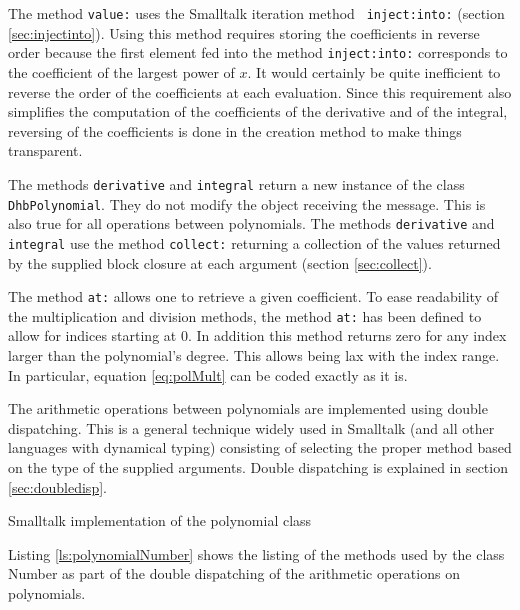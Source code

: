 \documentclass[twoside]{book}
\begin{document}
The method {\tt value:} uses the Smalltalk iteration method {\tt
inject:into:} (\cf section \ref{sec:injectinto}). Using this
method requires storing the coefficients in reverse order because
the first element fed into the method {\tt inject:into:}
corresponds to the coefficient of the largest power of $x$. It
would certainly be quite inefficient to reverse the order of the
coefficients at each evaluation. Since this requirement also
simplifies the computation of the coefficients of the derivative
and of the integral, reversing of the coefficients is done in the
creation method to make things transparent.

The methods {\tt derivative} and {\tt integral} return a new
instance of the class {\tt DhbPolynomial}. They do not modify the
object receiving the message. This is also true for all operations
between polynomials. The methods {\tt derivative} and {\tt
integral} use the method {\tt collect:} returning a collection of
the values returned by the supplied block closure at each argument
(\cf section \ref{sec:collect}).

The method {\tt at:} allows one to retrieve a given coefficient.
To ease readability of the multiplication and division methods,
the method {\tt at:} has been defined to allow for indices
starting at 0. In addition this method returns zero for any index
larger than the polynomial's degree. This allows being lax with
the index range. In particular, equation \ref{eq:polMult} can be
coded exactly as it is.

The arithmetic operations between polynomials are implemented
using double dispatching. This is a general technique widely used
in Smalltalk (and all other languages with dynamical typing)
consisting of selecting the proper method based on the type of the
supplied arguments. Double dispatching is explained in section
\ref{sec:doubledisp}.


\begin{listing}
Smalltalk implementation of the polynomial class
\label{ls:polynomial}

\end{listing}

Listing \ref{ls:polynomialNumber} shows the listing of the methods
used by the class Number as part of the double dispatching of the
arithmetic operations on polynomials.
\end{document}

